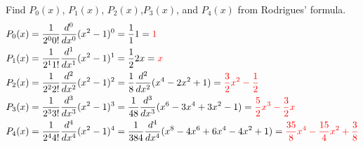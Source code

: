 \item[3.] Find $P_0(x)$, $P_1(x)$, $P_2(x)$,$P_3(x)$, and $P_4(x)$ from Rodrigues’ formula.
\begin{align*}
    P_0(x) 
    &= \frac{1}{2^{0} 0!} \frac{d^{0}}{dx^{0}} (x^2 - 1)^{0}
    = \frac{1}{1}1 
    = \textcolor{red}{1}\\
    P_1(x) 
    &= \frac{1}{2^{1} 1!} \frac{d^{1}}{dx^{1}} (x^2 - 1)^{1}
    = \frac{1}{2}2x 
    = \textcolor{red}{x}\\
    P_2(x) 
    &= \frac{1}{2^{2} 2!} \frac{d^{2}}{dx^{2}} (x^2 - 1)^{2}
    = \frac{1}{8}\frac{d^2}{dx^2}(x^4-2x^2+1) 
    = \textcolor{red}{\frac{3}{2}x^2-\frac{1}{2}}\\
    P_3(x) 
    &= \frac{1}{2^{3} 3!} \frac{d^{3}}{dx^{3}} (x^2 - 1)^{3}
    = \frac{1}{48}\frac{d^3}{dx^3}(x^6-3x^4+3x^2-1) 
    = \textcolor{red}{\frac{5}{2}x^3-\frac{3}{2}x}\\
    P_4(x) 
    &= \frac{1}{2^{4} 4!} \frac{d^{4}}{dx^{4}} (x^2 - 1)^{4}
    = \frac{1}{384}\frac{d^4}{dx^4}(x^8-4x^6+6x^4-4x^2+1) 
    = \textcolor{red}{\frac{35}{8}x^4-\frac{15}{4}x^2+\frac{3}{8}}\\
\end{align*}
